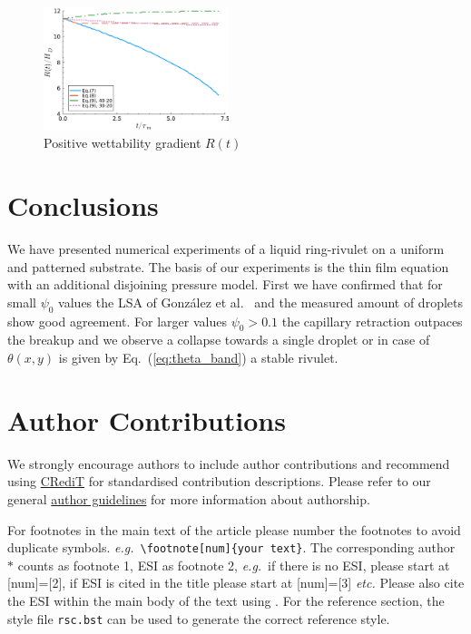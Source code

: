 \documentclass[twoside,twocolumn,9pt]{article}
\begin{document}
\begin{figure}
    \centering
    \includegraphics[width=0.48\textwidth]{assets/radius_time_gradient_positive.pdf}
    \caption{Positive wettability gradient $R(t)$}
    \label{fig:positivewetgrad}
\end{figure}

\section{Conclusions}\label{sec:conclu}
We have presented numerical experiments of a liquid ring-rivulet on a uniform and patterned substrate. 
The basis of our experiments is the thin film equation with an additional disjoining pressure model.
First we have confirmed that for small $\psi_0$ values the LSA of Gonz{\'a}lez et al.~\cite{gonzalezStabilityLiquidRing2013} and the measured amount of droplets show good agreement.
For larger values $\psi_0 > 0.1$ the capillary retraction outpaces the breakup and we observe a collapse towards a single droplet or in case of $\theta(x,y)$ is given by Eq.~(\ref{eq:theta_band}) a stable rivulet.



\section*{Author Contributions}
We strongly encourage authors to include author contributions and recommend using \href{https://casrai.org/credit/}{CRediT} for standardised contribution descriptions. Please refer to our general \href{https://www.rsc.org/journals-books-databases/journal-authors-reviewers/author-responsibilities/}{author guidelines} for more information about authorship.

For footnotes in the main text of the article please number the footnotes to avoid duplicate symbols. \textit{e.g.}\ \texttt{\textbackslash footnote[num]\{your text\}}. The corresponding author $\ast$ counts as footnote 1, ESI as footnote 2, \textit{e.g.}\ if there is no ESI, please start at [num]=[2], if ESI is cited in the title please start at [num]=[3] \textit{etc.} Please also cite the ESI within the main body of the text using \dag. For the reference section, the style file \texttt{rsc.bst} can be used to generate the correct reference style.
\end{document}
